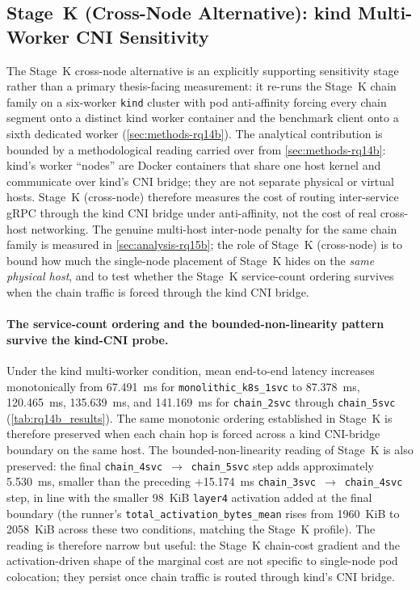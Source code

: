 \subsection{Stage~K (Cross-Node Alternative): kind Multi-Worker CNI Sensitivity}
\label{sec:analysis-rq14b}

The Stage~K cross-node alternative is an explicitly supporting sensitivity stage rather than a
primary thesis-facing measurement: it re-runs the Stage~K chain family
on a six-worker \texttt{kind} cluster with pod anti-affinity forcing
every chain segment onto a distinct kind worker container and the
benchmark client onto a sixth dedicated worker
(\cref{sec:methods-rq14b}). The analytical contribution is bounded
by a methodological reading carried over from
\cref{sec:methods-rq14b}: kind's worker ``nodes'' are Docker
containers that share one host kernel and communicate over kind's
CNI bridge; they are not separate physical or virtual hosts. Stage~K (cross-node)
therefore measures the cost of routing inter-service gRPC through
the kind CNI bridge under anti-affinity, not the cost of real
cross-host networking. The genuine multi-host inter-node penalty for
the same chain family is measured in
\cref{sec:analysis-rq15b}; the role of Stage~K (cross-node) is to bound how much
the single-node placement of Stage~K hides on the \emph{same physical
host}, and to test whether the Stage~K service-count ordering survives
when the chain traffic is forced through the kind CNI bridge.

\paragraph{The service-count ordering and the bounded-non-linearity pattern survive the kind-CNI probe.}
Under the kind multi-worker condition, mean end-to-end latency
increases monotonically from 67.491~ms for
\texttt{monolithic\_k8s\_1svc} to 87.378~ms, 120.465~ms, 135.639~ms,
and 141.169~ms for \texttt{chain\_2svc} through \texttt{chain\_5svc}
(\cref{tab:rq14b_results}). The same monotonic ordering established
in Stage~K is therefore preserved when each chain hop is forced across
a kind CNI-bridge boundary on the same host. The
bounded-non-linearity reading of Stage~K is also preserved: the final
\texttt{chain\_4svc}~$\rightarrow$~\texttt{chain\_5svc} step adds
approximately 5.530~ms, smaller than the preceding +15.174~ms
\texttt{chain\_3svc}~$\rightarrow$~\texttt{chain\_4svc} step, in line
with the smaller 98~KiB \texttt{layer4} activation added at the final
boundary (the runner's \texttt{total\_activation\_bytes\_mean} rises
from 1960~KiB to 2058~KiB across these two conditions, matching the
Stage~K profile). The reading is therefore narrow but useful: the
Stage~K chain-cost gradient and the activation-driven shape of the
marginal cost are not specific to single-node pod colocation; they
persist once chain traffic is routed through kind's CNI bridge.

